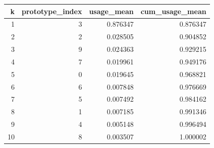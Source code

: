\begin{tabular}{rrrr}
\toprule
k & prototype_index & usage_mean & cum_usage_mean \\
\midrule
1 & 3 & 0.876347 & 0.876347 \\
2 & 2 & 0.028505 & 0.904852 \\
3 & 9 & 0.024363 & 0.929215 \\
4 & 7 & 0.019961 & 0.949176 \\
5 & 0 & 0.019645 & 0.968821 \\
6 & 6 & 0.007848 & 0.976669 \\
7 & 5 & 0.007492 & 0.984162 \\
8 & 1 & 0.007185 & 0.991346 \\
9 & 4 & 0.005148 & 0.996494 \\
10 & 8 & 0.003507 & 1.000002 \\
\bottomrule
\end{tabular}
